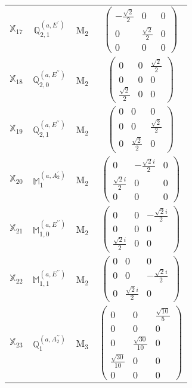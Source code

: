 \documentclass[fleqn,10pt,landscape]{article}
\begin{document}
\begin{itemize}
\begin{center}
\begin{longtable}{c|c|c|c}
$ \mathbb{X}_{17} $ & $\mathbb{Q}_{2,1}^{(a,E^{\prime})}$ & M$_{2}$ & $\begin{pmatrix} - \frac{\sqrt{2}}{2} & 0 & 0 \\ 0 & \frac{\sqrt{2}}{2} & 0 \\ 0 & 0 & 0 \end{pmatrix}$ \\
$ \mathbb{X}_{18} $ & $\mathbb{Q}_{2,0}^{(a,E^{\prime\prime})}$ & M$_{2}$ & $\begin{pmatrix} 0 & 0 & \frac{\sqrt{2}}{2} \\ 0 & 0 & 0 \\ \frac{\sqrt{2}}{2} & 0 & 0 \end{pmatrix}$ \\
$ \mathbb{X}_{19} $ & $\mathbb{Q}_{2,1}^{(a,E^{\prime\prime})}$ & M$_{2}$ & $\begin{pmatrix} 0 & 0 & 0 \\ 0 & 0 & \frac{\sqrt{2}}{2} \\ 0 & \frac{\sqrt{2}}{2} & 0 \end{pmatrix}$ \\
$ \mathbb{X}_{20} $ & $\mathbb{M}_{1}^{(a,A_{2}^{\prime})}$ & M$_{2}$ & $\begin{pmatrix} 0 & - \frac{\sqrt{2} i}{2} & 0 \\ \frac{\sqrt{2} i}{2} & 0 & 0 \\ 0 & 0 & 0 \end{pmatrix}$ \\
$ \mathbb{X}_{21} $ & $\mathbb{M}_{1,0}^{(a,E^{\prime\prime})}$ & M$_{2}$ & $\begin{pmatrix} 0 & 0 & - \frac{\sqrt{2} i}{2} \\ 0 & 0 & 0 \\ \frac{\sqrt{2} i}{2} & 0 & 0 \end{pmatrix}$ \\
$ \mathbb{X}_{22} $ & $\mathbb{M}_{1,1}^{(a,E^{\prime\prime})}$ & M$_{2}$ & $\begin{pmatrix} 0 & 0 & 0 \\ 0 & 0 & - \frac{\sqrt{2} i}{2} \\ 0 & \frac{\sqrt{2} i}{2} & 0 \end{pmatrix}$ \\ \hline
$ \mathbb{X}_{23} $ & $\mathbb{Q}_{1}^{(a,A_{2}^{\prime\prime})}$ & M$_{3}$ & $\begin{pmatrix} 0 & 0 & \frac{\sqrt{10}}{5} \\ 0 & 0 & 0 \\ 0 & \frac{\sqrt{30}}{10} & 0 \\ \frac{\sqrt{30}}{10} & 0 & 0 \\ 0 & 0 & 0 \end{pmatrix}$ \\

\end{longtable}
\end{center}
\end{itemize}
\end{document}
